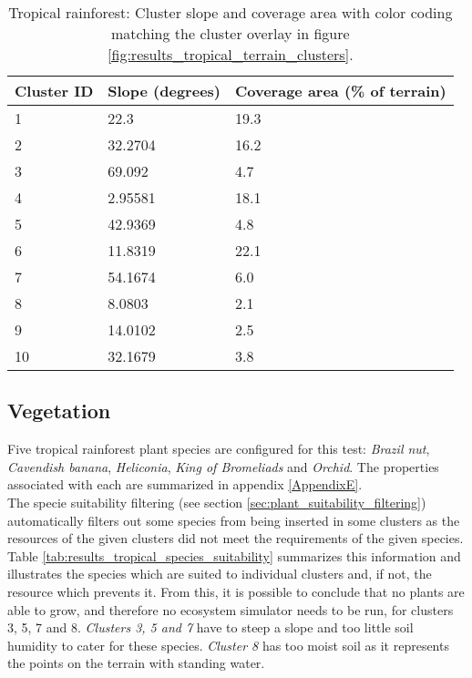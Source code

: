 \begin{table}[h]
  \centering
	    \begin{tabular}{|p{5cm}|p{5cm}|p{5cm}|}
		\hline	
  	    \textbf{Cluster ID} & \textbf{Slope (degrees)} & \textbf{Coverage area (\% of terrain)} \\
  	    \hline	
		\cellcolor{trop_cluster_1} 1 & 22.3 & 19.3 \\
		\hline
		\cellcolor{trop_cluster_2} 2 & 32.2704 & 16.2 \\
		\hline
		\cellcolor{trop_cluster_3} 3 & 69.092 & 4.7 \\
		\hline
		\cellcolor{trop_cluster_4}4 & 2.95581 & 18.1 \\
		\hline
		\cellcolor{trop_cluster_5} 5 & 42.9369 & 4.8 \\
		\hline
		\cellcolor{trop_cluster_6} 6 & 11.8319 & 22.1 \\
		\hline
		\cellcolor{trop_cluster_7} 7 & 54.1674 & 6.0 \\
		\hline
		\cellcolor{trop_cluster_8} 8 & 8.0803 & 2.1 \\
		\hline
		\cellcolor{trop_cluster_9} 9 & 14.0102 & 2.5 \\
		\hline
		\cellcolor{trop_cluster_10} 10 & 32.1679 & 3.8 \\
		\hline
		\end{tabular}
		\caption{Tropical rainforest: Cluster slope and coverage area with color coding matching the cluster overlay in figure \ref{fig:results_tropical_terrain_clusters}.}
	  \label{tab:results_tropical_cluster_slope_covarea}
\end{table}

\subsection{Vegetation}

Five tropical rainforest plant species are configured for this test: \textit{Brazil nut}, \textit{Cavendish banana}, \textit{Heliconia}, \textit{King of Bromeliads} and \textit{Orchid}. The properties associated with each are summarized in appendix \ref{AppendixE}.\\

The specie suitability filtering (see section \ref{sec:plant_suitability_filtering}) automatically filters out some species from being inserted in some clusters as the resources of the given clusters did not meet the requirements of the given species. Table \ref{tab:results_tropical_species_suitability} summarizes this information and illustrates the species which are suited to individual clusters and, if not, the resource which prevents it. From this, it is possible to conclude that no plants are able to grow, and therefore no ecosystem simulator needs to be run, for clusters 3, 5, 7 and 8. \textit{Clusters 3, 5 and 7} have to steep a slope and too little soil humidity to cater for these species. \textit{Cluster 8} has too moist soil as it represents the points on the terrain with standing water.\\

